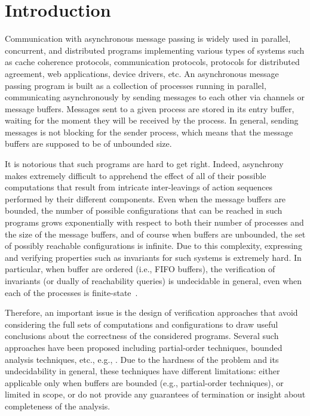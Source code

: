 \section{Introduction}

Communication with asynchronous message passing is widely used in parallel, concurrent, and distributed programs implementing various types of systems such as cache coherence protocols, communication protocols, protocols for distributed agreement, web applications, device drivers, etc. 
%
An asynchronous message passing program is built as a collection of processes running in parallel, communicating asynchronously by sending messages to each other via channels or message buffers. Messages sent to a given process are stored in its entry buffer, waiting for the moment they will be received by the process. In general, sending messages is not blocking for the sender process, which means that the message buffers are supposed to be of unbounded size. 

It is notorious that such programs are hard to get right. Indeed, asynchrony makes extremely difficult to apprehend the effect of all of their possible computations that result from intricate inter-leavings of action sequences performed by their different components. Even when the message buffers are bounded, the number of possible configurations that can be reached in such programs grows exponentially with respect to both their number of processes and the size of the message buffers, and of course when buffers are unbounded, the set of possibly reachable configurations is infinite. Due to this complexity, expressing and verifying properties such as invariants for such systems is extremely hard. In particular, when buffer are ordered (i.e., FIFO buffers), the verification of invariants (or dually of reachability queries) is undecidable in general, even when each of the processes is finite-state~\cite{DBLP:journals/jacm/BrandZ83}.

Therefore, an important issue is the design of verification approaches that avoid considering the full sets of computations and configurations to draw useful conclusions about the correctness of the considered programs. Several such approaches have been proposed including partial-order techniques, bounded analysis techniques, etc., e.g., \cite{DBLP:journals/tcs/BasuB16,DBLP:conf/oopsla/Desai0M14,DBLP:conf/tacas/BouajjaniE12,DBLP:conf/tacas/TorreMP08,DBLP:conf/popl/FlanaganG05}. Due to the hardness of the problem and its undecidability in general, these techniques have different limitations: either applicable only when buffers are bounded (e.g., partial-order techniques), or limited in scope, or do not provide any guarantees of termination or insight about completeness of the analysis.

